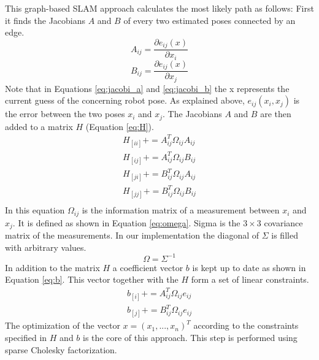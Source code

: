 \documentclass{ba-kecs}
\begin{document}
This graph-based SLAM approach calculates the most likely path as follows:
First it finds the Jacobians \(A\) and \(B\) of every two estimated poses connected by an edge.
\begin{equation}
\label{eq:jacobi_a}
	A_{ij} = \frac{\partial e_{ij}(x)}{\partial x_i}
\end{equation}
\begin{equation}
\label{eq:jacobi_b}
	B_{ij} = \frac{\partial e_{ij}(x)}{\partial x_j}
\end{equation}
Note that in Equations \ref{eq:jacobi_a} and \ref{eq:jacobi_b} the x represents the current guess of the concerning robot pose. As explained above, \(e_{ij}(x_i, x_j)\) is the error between the two poses \(x_i\) and \(x_j\). The Jacobians \(A\) and \(B\) are then added to a matrix \(H\) (Equation \ref{eq:H}).
\begin{equation}
\label{eq:H}
\begin{aligned}
	H_{[ii]} += A^{T}_{ij} \Omega_{ij} A_{ij} \\
	H_{[ij]} += A^{T}_{ij} \Omega_{ij} B_{ij} \\
	H_{[ji]} += B^{T}_{ij} \Omega_{ij} A_{ij} \\
	H_{[jj]} += B^{T}_{ij} \Omega_{ij} B_{ij} \\
\end{aligned}
\end{equation}
In this equation $\Omega_{ij}$ is the information matrix of a measurement between \(x_i\) and \(x_j\). It is defined as shown in Equation \ref{eq:omega}.
Sigma is the $3 \times 3$ covariance matrix of the measurements. In our implementation the diagonal of $\Sigma$ is filled with arbitrary values.
\begin{equation}
\label{eq:omega}
\Omega = \Sigma^{-1}
\end{equation}
In addition to the matrix $H$ a coefficient vector \(b\) is kept up to date as shown in Equation \ref{eq:b}. This vector together with the \(H\) form a set of linear constraints.
\begin{equation}
\label{eq:b}
\begin{aligned}
	b_{[i]} += A^{T}_{ij} \Omega_{ij} e_{ij} \\
	b_{[j]} += B^{T}_{ij} \Omega_{ij} e_{ij} 
\end{aligned}
\end{equation}
The optimization of the vector \(x = (x_1, ..., x_n)^T \) according to the constraints specified in \(H\) and \(b\) is the core of this approach. This step is performed using sparse Cholesky factorization. 
\end{document}
